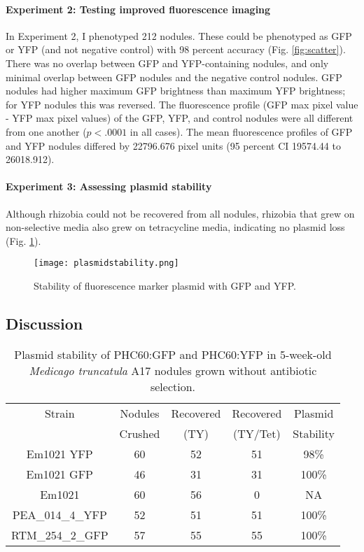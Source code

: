 \documentclass[12pt]{article}
\begin{document}
\begin{doublespace}
	\paragraph{Experiment 2: Testing improved fluorescence imaging}
In Experiment 2, I phenotyped 212 nodules. These could be phenotyped as GFP or YFP (and not negative control) with 98 percent accuracy (Fig. \ref{fig:scatter}). There was no overlap between GFP and YFP-containing nodules, and only minimal overlap between GFP nodules and the negative control nodules. GFP nodules had higher maximum GFP brightness than maximum YFP brightness; for YFP nodules this was reversed. The fluorescence profile (GFP max pixel value - YFP max pixel values) of the GFP, YFP, and control nodules were all different from one another ($p<.0001$ in all cases). The mean fluorescence profiles of GFP and YFP nodules differed by 22796.676 pixel units (95 percent CI 19574.44 to 26018.912).

	\paragraph{Experiment 3: Assessing plasmid stability} %
 Although rhizobia could not be recovered from all nodules, rhizobia that grew on non-selective media also grew on tetracycline media, indicating no plasmid loss (Fig. \ref{fig:plasmidstability}). 


	\begin{figure}[h!]
		\centering
		\texttt{[image: plasmidstability.png]}
		\caption{Stability of fluorescence marker plasmid with GFP and YFP.}
		\label{fig:plasmidstability}
	\end{figure}


\subsection{Discussion}

\begin{table}[]
	\centering
	\caption{Plasmid stability of PHC60:GFP and PHC60:YFP in 5-week-old \textit{Medicago truncatula} A17 nodules grown without antibiotic selection.}
	\label{stability}
	\begin{tabular}{@{}ccccc@{}}
		\toprule
		Strain           & Nodules    & Recovered    & Recovered        & Plasmid  \\ 
		                 & Crushed    & (TY)         & (TY/Tet)         & Stability \\ \midrule
		Em1021 YFP       & 60         & 52           & 51               & 98\%   \\
		Em1021 GFP       & 46         & 31           & 31               & 100\%  \\
		Em1021           & 60         & 56           & 0                & NA     \\
		PEA\_014\_4\_YFP & 52         & 51           & 51               & 100\%  \\
		RTM\_254\_2\_GFP & 57         & 55           & 55               & 100\% 
	\end{tabular}


\end{table}
\end{doublespace}
\end{document}
